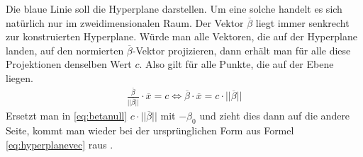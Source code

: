 \documentclass[
]{article}
\begin{document}
Die blaue Linie soll die Hyperplane darstellen. Um eine solche handelt
es sich natürlich nur im zweidimensionalen Raum. Der Vektor
\(\overline{\beta}\) liegt immer senkrecht zur konstruierten Hyperplane.
Würde man alle Vektoren, die auf der Hyperplane landen, auf den
normierten \(\overline{\beta}\)-Vektor projizieren, dann erhält man für
alle diese Projektionen denselben Wert \(c\). Also gilt für alle Punkte,
die auf der Ebene liegen. \begin{align}
\frac{\overline \beta}{||\overline{\beta}||}\cdot \overline{x}=c \Leftrightarrow \overline{\beta}\cdot \overline{x}=c \cdot ||\overline{\beta}||\label{eq:betanull}
\end{align} Ersetzt man in \eqref{eq:betanull}
\(c \cdot ||\overline{\beta}||\) mit \(-\beta_0\) und zieht dies dann
auf die andere Seite, kommt man wieder bei der ursprünglichen Form aus
Formel \eqref{eq:hyperplanevec} raus
\parencite{mavroforakisGeometricApproachSupport2006}.
\end{document}
